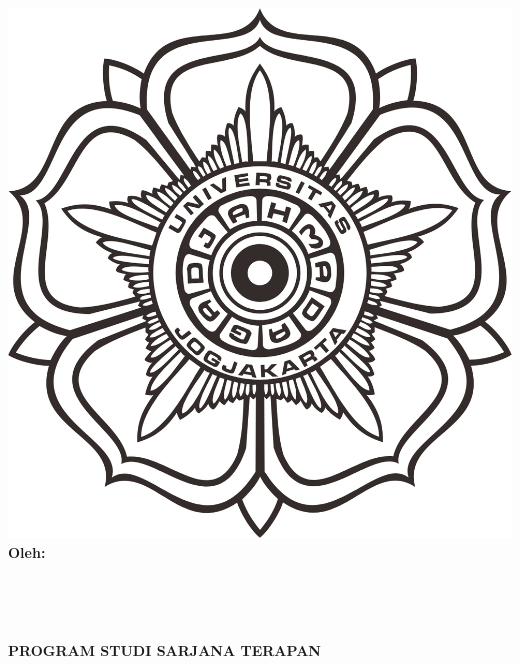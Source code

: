 \begin{titlepage}
    \begin{center}

        \begin{doublespace}
            \textbf{\MakeUppercase{\large{\tipe}}}\\[0.5cm]
            \textbf{\MakeUppercase{\normalsize{\perusahaan}}}\\[3cm]
        \end{doublespace} 
        
        \includegraphics[width=0.35\linewidth]{gambar/logo-ugm.png}\\[3cm]

        \textbf{\large {Oleh:}} \\
        
        \textbf{\normalsize \MakeUppercase{\underline{\penulisPertama}}} \\
        \textbf{\normalsize \MakeUppercase{{\nimPertama}}} \\[0.5cm]
        
        \textbf{\normalsize \MakeUppercase{\underline{\penulisKedua}}} \\
        \textbf{\normalsize \MakeUppercase{{\nimKedua}}} \\[2cm]

        \textbf{\normalsize \MakeUppercase{Program Studi Sarjana Terapan}}\\
        \textbf{\normalsize \MakeUppercase{\prodi}}\\
        \textbf{\normalsize \MakeUppercase{\departemen}}\\
        \textbf{\normalsize \MakeUppercase{\fakultas}}\\
        \textbf{\normalsize \MakeUppercase{\universitas}}\\
        \textbf{\normalsize \the\year{}}\\
    \end{center}
\end{titlepage}